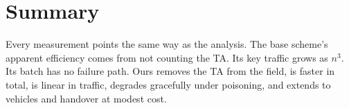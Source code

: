 \section{Summary}
Every measurement points the same way as the analysis. The base scheme's apparent efficiency comes from not counting the TA. Its key traffic grows as $n^3$.
Its batch has no failure path. Ours removes the TA from the field, is faster in total, is linear in traffic, degrades gracefully under poisoning, and
extends to vehicles and handover at modest cost.
